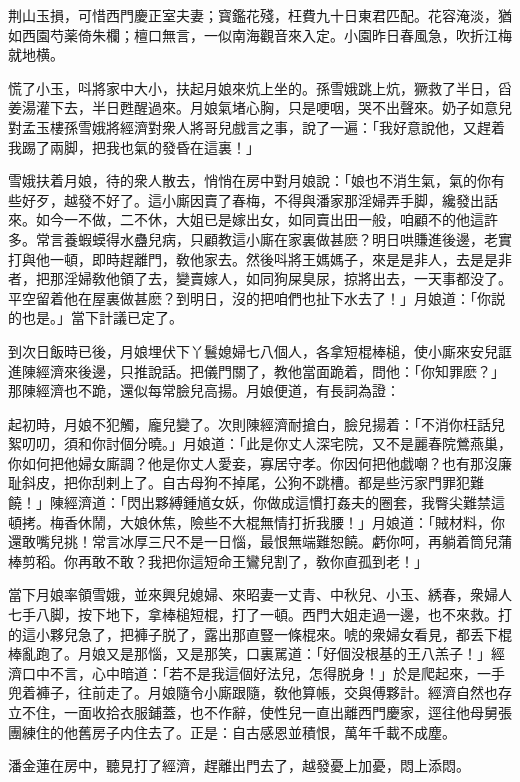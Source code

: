 荆山玉損，可惜西門慶正室夫妻；寳鑑花殘，枉費九十日東君匹配。花容淹淡，猶如西園芍薬倚朱欄；檀口無言，一似南海觀音來入定。小園昨日春風急，吹折江梅就地横。

慌了小玉，呌將家中大小，扶起月娘來炕上坐的。孫雪娥跳上炕，獗救了半日，舀姜湯灌下去，半日甦醒過來。月娘氣堵心胸，只是哽咽，哭不出聲來。奶子如意兒對孟玉樓孫雪娥將經濟對衆人將哥兒戲言之事，說了一遍：「我好意說他，又趕着我踢了兩脚，把我也氣的發昏在這裏！」

雪娥扶着月娘，待的衆人散去，悄悄在房中對月娘說：「娘也不消生氣，氣的你有些好歹，越發不好了。這小廝因賣了春梅，不得與潘家那淫婦弄手脚，纔發出話來。如今一不做，二不休，大姐已是嫁出女，如同賣出田一般，咱顧不的他這許多。常言養蝦蟆得水蠱兒病，只顧教這小廝在家裏做甚麽？明日哄賺進後邊，老實打與他一頓，即時趕離門，敎他家去。然後呌將王媽媽子，來是是非人，去是是非者，把那淫婦敎他領了去，變賣嫁人，如同狗屎臭尿，掠將出去，一天事都没了。平空留着他在屋裏做甚麽？到明日，沒的把咱們也扯下水去了！」月娘道：「你説的也是。」當下計議已定了。

到次日飯時已後，月娘埋伏下丫鬟媳婦七八個人，各拿短棍棒槌，使小廝來安兒誆進陳經濟來後邊，只推說話。把儀門關了，教他當面跪着，問他：「你知罪麽？」那陳經濟也不跪，還似每常臉兒高揚。月娘便道，有長詞為證：

起初時，月娘不犯觸，龐兒變了。次則陳經濟耐搶白，臉兒揚着：「不消你枉話兒絮叨叨，須和你討個分曉。」月娘道：「此是你丈人深宅院，又不是麗春院鶯燕巢，你如何把他婦女廝調？他是你丈人愛妾，寡居守孝。你因何把他戯嘲？也有那沒廉耻斜皮，把你刮剌上了。自古母狗不掉尾，公狗不跳槽。都是些污家門罪犯難饒！」陳經濟道：「閃出夥縛鍾馗女妖，你做成這慣打姦夫的圈套，我臀尖難禁這頓拷。梅香休鬧，大娘休焦，險些不大棍無情打折我腰！」月娘道：「賊材料，你還敢嘴兒挑！常言冰厚三尺不是一日惱，最恨無端難恕饒。虧你呵，再躺着筒兒蒲棒剪稻。你再敢不敢？我把你這短命王鸞兒割了，敎你直孤到老！」

當下月娘率領雪娥，並來興兒媳婦、來昭妻一丈青、中秋兒、小玉、綉春，衆婦人七手八脚，按下地下，拿棒槌短棍，打了一頓。西門大姐走過一邊，也不來救。打的這小夥兒急了，把褲子脱了，露出那直豎一條棍來。唬的衆婦女看見，都丢下棍棒亂跑了。月娘又是那惱，又是那笑，口裏駡道：「好個没根基的王八羔子！」經濟口中不言，心中暗道：「若不是我這個好法兒，怎得脱身！」於是爬起來，一手兜着褲子，往前走了。月娘隨令小廝跟隨，敎他算帳，交與傅夥計。經濟自然也存立不住，一面收拾衣服鋪蓋，也不作辭，使性兒一直出離西門慶家，逕往他母舅張團練住的他舊房子内住去了。正是：自古感恩並積恨，萬年千載不成塵。

潘金蓮在房中，聽見打了經濟，趕離出門去了，越發憂上加憂，悶上添悶。

